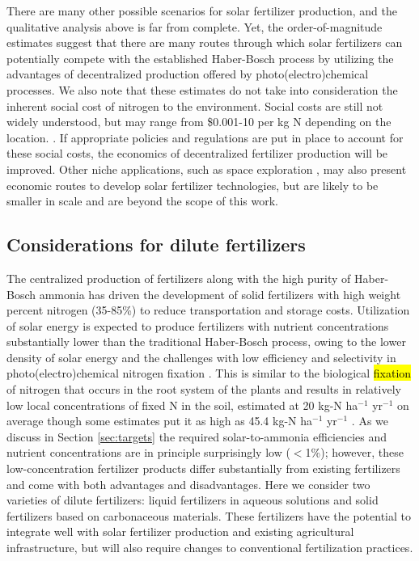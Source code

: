 There are many other possible scenarios for solar fertilizer production, and the qualitative analysis above is far from complete. Yet, the order-of-magnitude estimates suggest that there are many routes through which solar fertilizers can potentially compete with the established Haber-Bosch process by utilizing the advantages of decentralized production offered by photo(electro)chemical processes. We also note that these estimates do not take into consideration the inherent social cost of nitrogen to the environment. Social costs are still not widely understood, but may range from \$0.001-10 per kg N depending on the location. \cite{keeler2016social}. If appropriate policies and regulations are put in place to account for these social costs, the economics of decentralized fertilizer production will be improved. Other niche applications, such as space exploration \cite{Meyer_2016}, may also present economic routes to develop solar fertilizer technologies, but are likely to be smaller in scale and are beyond the scope of this work. 

\subsection{Considerations for dilute fertilizers}
\label{sec:dilute}

The centralized production of fertilizers along with the high purity of Haber-Bosch ammonia has driven the development of solid fertilizers with high weight percent nitrogen (35-85\%) to reduce transportation and storage costs. 
Utilization of solar energy is expected to produce fertilizers with nutrient concentrations substantially lower than the traditional Haber-Bosch process, owing to the lower density of solar energy \cite{MacKay_2013} and the challenges with low efficiency and selectivity in photo(electro)chemical nitrogen fixation \cite{Skulason_2012,Singh_2017}. This is similar to the biological \hl{fixation} of nitrogen that occurs in the root system of the plants and results in relatively low local concentrations of fixed N in the soil, estimated at 20 kg-N ha$^{-1}$ yr$^{-1}$ on average \cite{Smil_1999_2,Unkovich_2009} though some estimates put it as high as 45.4 kg-N ha$^{-1}$ yr$^{-1}$ \cite{Herridge_2008}. As we discuss in Section \ref{sec:targets} the required solar-to-ammonia efficiencies and nutrient concentrations are in principle surprisingly low ($<$1\%); however, these low-concentration fertilizer products differ substantially from existing fertilizers and come with both advantages and disadvantages. Here we consider two varieties of dilute fertilizers: liquid fertilizers in aqueous solutions and solid fertilizers based on carbonaceous materials. These fertilizers have the potential to integrate well with solar fertilizer production and existing agricultural infrastructure, but will also require changes to conventional fertilization practices.

